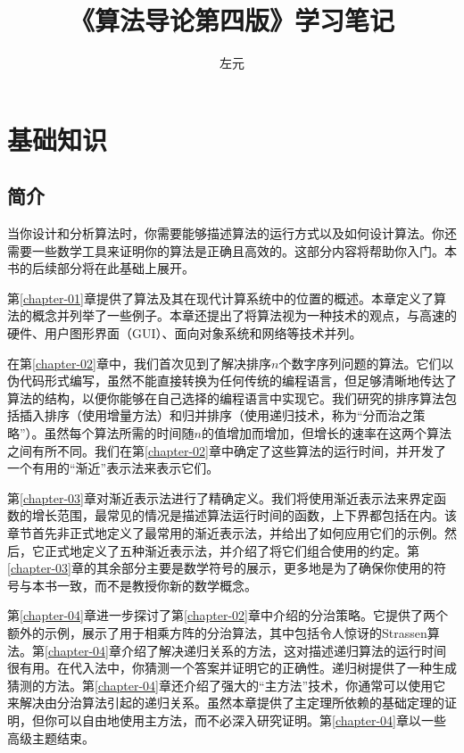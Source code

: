 \documentclass[lang=cn,newtx,10pt,scheme=chinese]{elegantbook}
\title{《算法导论第四版》学习笔记}
\author{左元}
\begin{document}
\maketitle
\frontmatter

\tableofcontents

\mainmatter

\part{基础知识}

\chapter*{简介}

当你设计和分析算法时，你需要能够描述算法的运行方式以及如何设计算法。你还需要一些数学工具来证明你的算法是正确且高效的。这部分内容将帮助你入门。本书的后续部分将在此基础上展开。

第\ref{chapter-01}章提供了算法及其在现代计算系统中的位置的概述。本章定义了算法的概念并列举了一些例子。本章还提出了将算法视为一种技术的观点，与高速的硬件、用户图形界面（GUI）、面向对象系统和网络等技术并列。

在第\ref{chapter-02}章中，我们首次见到了解决排序$n$个数字序列问题的算法。它们以伪代码形式编写，虽然不能直接转换为任何传统的编程语言，但足够清晰地传达了算法的结构，以便你能够在自己选择的编程语言中实现它。我们研究的排序算法包括插入排序（使用增量方法）和归并排序（使用递归技术，称为``分而治之策略''）。虽然每个算法所需的时间随$n$的值增加而增加，但增长的速率在这两个算法之间有所不同。我们在第\ref{chapter-02}章中确定了这些算法的运行时间，并开发了一个有用的``渐近''表示法来表示它们。

第\ref{chapter-03}章对渐近表示法进行了精确定义。我们将使用渐近表示法来界定函数的增长范围，最常见的情况是描述算法运行时间的函数，上下界都包括在内。该章节首先非正式地定义了最常用的渐近表示法，并给出了如何应用它们的示例。然后，它正式地定义了五种渐近表示法，并介绍了将它们组合使用的约定。第\ref{chapter-03}章的其余部分主要是数学符号的展示，更多地是为了确保你使用的符号与本书一致，而不是教授你新的数学概念。

第\ref{chapter-04}章进一步探讨了第\ref{chapter-02}章中介绍的分治策略。它提供了两个额外的示例，展示了用于相乘方阵的分治算法，其中包括令人惊讶的Strassen算法。第\ref{chapter-04}章介绍了解决递归关系的方法，这对描述递归算法的运行时间很有用。在代入法中，你猜测一个答案并证明它的正确性。递归树提供了一种生成猜测的方法。第\ref{chapter-04}章还介绍了强大的``主方法''技术，你通常可以使用它来解决由分治算法引起的递归关系。虽然本章提供了主定理所依赖的基础定理的证明，但你可以自由地使用主方法，而不必深入研究证明。第\ref{chapter-04}章以一些高级主题结束。
\end{document}
